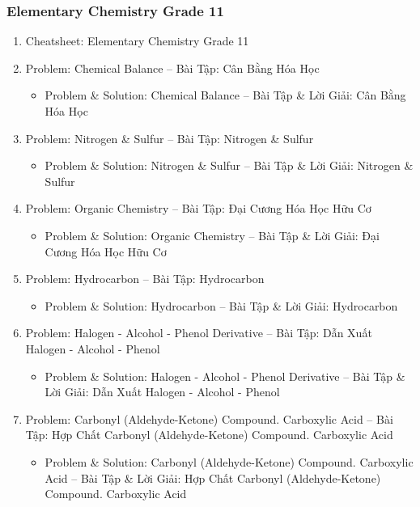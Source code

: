 \documentclass[12pt,twoside]{book}
\begin{document}
\subsubsection{Elementary Chemistry Grade 11}

\begin{enumerate}
	\item Cheatsheet: Elementary Chemistry Grade 11
	\item Problem: Chemical Balance -- Bài Tập: Cân Bằng Hóa Học
	\begin{itemize}
		\item Problem \& Solution: Chemical Balance -- Bài Tập \& Lời Giải: Cân Bằng Hóa Học
	\end{itemize}
	\item Problem: Nitrogen \& Sulfur -- Bài Tập: Nitrogen \& Sulfur
	\begin{itemize}
		\item Problem \& Solution: Nitrogen \& Sulfur -- Bài Tập \& Lời Giải: Nitrogen \& Sulfur
	\end{itemize}
	\item Problem: Organic Chemistry -- Bài Tập: Đại Cương Hóa Học Hữu Cơ
	\begin{itemize}
		\item Problem \& Solution: Organic Chemistry -- Bài Tập \& Lời Giải: Đại Cương Hóa Học Hữu Cơ
	\end{itemize}
	\item Problem: Hydrocarbon -- Bài Tập: Hydrocarbon
	\begin{itemize}
		\item Problem \& Solution: Hydrocarbon -- Bài Tập \& Lời Giải: Hydrocarbon
	\end{itemize}
	\item Problem: Halogen - Alcohol - Phenol Derivative -- Bài Tập: Dẫn Xuất Halogen - Alcohol - Phenol
	\begin{itemize}
		\item Problem \& Solution: Halogen - Alcohol - Phenol Derivative -- Bài Tập \& Lời Giải: Dẫn Xuất Halogen - Alcohol - Phenol
	\end{itemize}
	\item Problem: Carbonyl (Aldehyde-Ketone) Compound. Carboxylic Acid -- Bài Tập: Hợp Chất Carbonyl (Aldehyde-Ketone) Compound. Carboxylic Acid
	\begin{itemize}
		\item Problem \& Solution: Carbonyl (Aldehyde-Ketone) Compound. Carboxylic Acid -- Bài Tập \& Lời Giải: Hợp Chất Carbonyl (Aldehyde-Ketone) Compound. Carboxylic Acid
	\end{itemize}
\end{enumerate}
\end{document}
